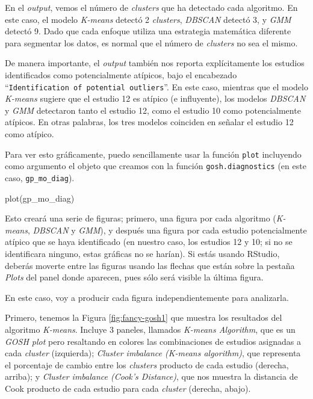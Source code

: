 \documentclass[
  bookmarksnumbered]{article}
\newenvironment{Shaded}{\begin{snugshade}}{\end{snugshade}}
\newcommand{\FunctionTok}[1]{\textcolor[rgb]{0.39,0.29,0.61}{#1}}
\newcommand{\NormalTok}[1]{\textcolor[rgb]{0.12,0.11,0.11}{#1}}
\begin{document}
En el \emph{output}, vemos el número de \emph{clusters} que ha detectado cada algoritmo. En este caso, el modelo \emph{K-means} detectó 2 \emph{clusters}, \emph{DBSCAN} detectó 3, y \emph{GMM} detectó 9. Dado que cada enfoque utiliza una estrategia matemática diferente para segmentar los datos, es normal que el número de \emph{clusters} no sea el mismo.

De manera importante, el \emph{output} también nos reporta explícitamente los estudios identificados como potencialmente atípicos, bajo el encabezado ``\texttt{Identification\ of\ potential\ outliers}''. En este caso, mientras que el modelo \emph{K-means} sugiere que el estudio 12 es atípico (e influyente), los modelos \emph{DBSCAN} y \emph{GMM} detectaron tanto el estudio 12, como el estudio 10 como potencialmente atípicos. En otras palabras, los tres modelos coinciden en señalar el estudio 12 como atípico.

Para ver esto gráficamente, puedo sencillamente usar la función \texttt{plot} incluyendo como argumento el objeto que creamos con la función \texttt{gosh.diagnostics} (en este caso, \texttt{gp\_mo\_diag}).

\begin{Shaded}
\begin{Highlighting}[]
\FunctionTok{plot}\NormalTok{(gp\_mo\_diag)}
\end{Highlighting}
\end{Shaded}

Esto creará una serie de figuras; primero, una figura por cada algoritmo (\emph{K-means}, \emph{DBSCAN} y \emph{GMM}), y después una figura por cada estudio potencialmente atípico que se haya identificado (en nuestro caso, los estudios 12 y 10; si no se identificara ninguno, estas gráficas no se harían). Si estás usando RStudio, deberás moverte entre las figuras usando las flechas que están sobre la pestaña \emph{Plots} del panel donde aparecen, pues sólo será visible la última figura.

En este caso, voy a producir cada figura independientemente para analizarla.

Primero, tenemos la Figura \ref{fig:fancy-gosh1} que muestra los resultados del algoritmo \emph{K-means}. Incluye 3 paneles, llamados \emph{K-means Algorithm}, que es un \emph{GOSH plot} pero resaltando en colores las combinaciones de estudios asignadas a cada \emph{cluster} (izquierda); \emph{Cluster imbalance (K-means algorithm)}, que representa el porcentaje de cambio entre los \emph{clusters} producto de cada estudio (derecha, arriba); y \emph{Cluster imbalance (Cook's Distance)}, que nos muestra la distancia de Cook producto de cada estudio para cada \emph{cluster} (derecha, abajo).
\end{document}
